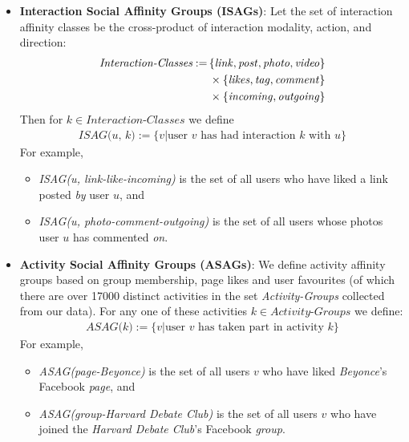 \begin{itemize}
  \item \textbf{Interaction Social Affinity Groups (ISAGs)}: Let the set of
  interaction affinity classes be the cross-product of interaction
  modality, action, and direction:
  \begin{align*}
  	\textit{Interaction-Classes} := \, & \{\link, \post, \photo, \video\} \\
                                           & \times \{\like, \ttag, \comment\} \\
                                           & \times \{\incoming, \outgoing\}
  \end{align*}
  Then for $k \in \textit{Interaction-Classes}$ we define 
  \begin{align*}
     \textit{ISAG(u, k)} := \{ v | \textrm{user $v$ has had interaction $k$ with $u$} \}
  \end{align*}
  For example,
  \begin{itemize}
     \item \textit{ISAG(u, link-like-incoming)} is the set of all users who
     have liked a link posted \emph{by} user $u$, and 
     \item \textit{ISAG(u, photo-comment-outgoing)} is the set of all users whose photos
     user $u$ has commented \emph{on}.
  \end{itemize}
\item \textbf{Activity Social Affinity Groups (ASAGs)}: We define activity affinity groups based on group membership, page likes and user favourites (of which there are over 17000 distinct activities in the set \textit{Activity-Groups} collected from our data).  For any one
of these activities $k \in \textit{Activity-Groups}$ we define:
  \begin{align*}
     \textit{ASAG(k)} := \{ v | \textrm{user $v$ has taken part in activity $k$} \}
  \end{align*}
  For example,
  \begin{itemize}
     \item \textit{ASAG(page-Beyonce)} is the set of all users $v$ who 
     have liked \emph{Beyonce}'s Facebook \emph{page}, and 
     \item \textit{ASAG(group-Harvard Debate Club)} is the set of all users $v$ who 
     have joined the \emph{Harvard Debate Club}'s Facebook \emph{group}.
  \end{itemize}
\end{itemize}


